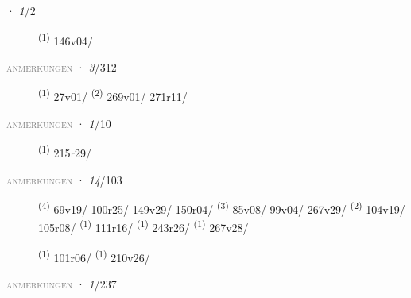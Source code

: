 \noindent{} · \textit{1}/2 \LEMMALINE
\begin{description}
    \item[]  \textsuperscript{(1)} \mbox{146v04/}
\end{description}
\textsc{\textcolor{gray}{anmerkungen}}
\ENTRYEND
\noindent{} · \textit{3}/312 \LEMMALINE
\begin{description}
    \item[]  \textsuperscript{(1)} \mbox{27v01/} \textsuperscript{(2)} \mbox{269v01/} \mbox{271r11/}
\end{description}
\textsc{\textcolor{gray}{anmerkungen}}
\ENTRYEND
\noindent{} · \textit{1}/10 \LEMMALINE
\begin{description}
    \item[]  \textsuperscript{(1)} \mbox{215r29/}
\end{description}
\textsc{\textcolor{gray}{anmerkungen}}
\ENTRYEND
\noindent{} · \textit{14}/103 \LEMMALINE
\begin{description}
    \item[]  \textsuperscript{(4)} \mbox{69v19/} \mbox{100r25/} \mbox{149v29/} \mbox{150r04/} \textsuperscript{(3)} \mbox{85v08/} \mbox{99v04/} \mbox{267v29/} \textsuperscript{(2)} \mbox{104v19/} \mbox{105r08/} \textsuperscript{(1)} \mbox{111r16/} \textsuperscript{(1)} \mbox{243r26/} \textsuperscript{(1)} \mbox{267v28/}
    \item[]  \textsuperscript{(1)} \mbox{101r06/} \CASEBREAK {} \textsuperscript{(1)} \mbox{210v26/}
\end{description}
\textsc{\textcolor{gray}{anmerkungen}}
\ENTRYEND
\noindent{} · \textit{1}/237 \LEMMALINE
